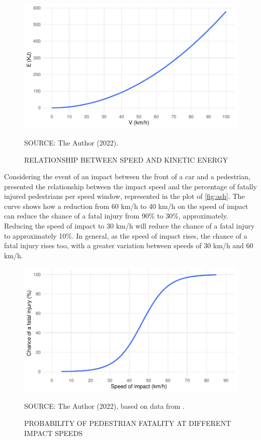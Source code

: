 \begin{figure}[!htbp]
    \centering\footnotesize
    \captionsetup{font=footnotesize}
    \caption{RELATIONSHIP BETWEEN SPEED AND KINETIC ENERGY}
    \includegraphics{fig/kinetic.pdf}
    \label{fig:kinetic}
    \par SOURCE: The Author (2022).
\end{figure}

Considering the event of an impact between the front of a car and a pedestrian, \textcite{Ashton1980} presented the relationship between the impact speed and the percentage of fatally injured pedestrians per speed window, represented in the plot of \autoref{fig:ash}. The curve shows how a reduction from 60 km/h to 40 km/h on the speed of impact can reduce the chance of a fatal injury from 90\% to 30\%, approximately. Reducing the speed of impact to 30 km/h will reduce the chance of a fatal injury to approximately 10\%. In general, as the speed of impact rises, the chance of a fatal injury rises too, with a greater variation between speeds of 30 km/h and 60 km/h. 

\begin{figure}[!htbp]
    \centering\footnotesize
    \captionsetup{font=footnotesize}
    \caption{PROBABILITY OF PEDESTRIAN FATALITY AT DIFFERENT IMPACT SPEEDS}
    \includegraphics{fig/ash.pdf}
    \label{fig:ash}
    \par SOURCE: The Author (2022), based on data from \textcite{Ashton1980}.
\end{figure}

